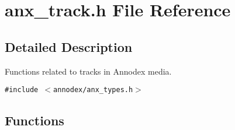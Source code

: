 \section{anx\_\-track.h File Reference}
\label{anx__track_8h}


\subsection{Detailed Description}
Functions related to tracks in Annodex media. 



{\tt \#include $<$annodex/anx\_\-types.h$>$}\par
\subsection*{Functions}
